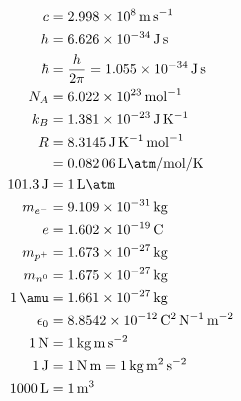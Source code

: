 \begin{align*}
c&= \SI{2.998e8}{\meter\per\second}\\
h&= \SI{6.626e-34}{\joule\second}\\
\hbar &= \frac{h}{2 \pi } = \SI{1.055e-34}{\joule\second}\\
N_A&= \SI{6.022e23}{\per\mole}\\
k_B&= \SI{1.381e-23}{\joule\per\kelvin}\\
R&= \SI{8.3145}{\joule\per\kelvin\per\mole}\\
&= \SI{0.08206}{\liter\atm\per\mole\per\kelvin}\\
\SI{101.3}{\joule}&=\SI{1}{\liter\atm}\\
m_{e^-}&=\SI{9.109e-31}{\kilo\gram}\\
e &= \SI{1.602e-19}{\coulomb}\\
m_{p^+}&=\SI{1.673e-27}{\kilo\gram}\\
m_{n^0} &= \SI{1.675e-27}{\kilo\gram}\\
\SI{1}{\amu} &= \SI{1.661e-27}{\kilo\gram}\\
\epsilon_0 &= \SI{8.8542e-12}{\coulomb\squared\per\newton\per\meter\squared}\\
\SI{1}{\newton} &= \SI{1}{\kilo\gram\meter\per\second\squared}\\
\SI{1}{\joule}&= \SI{1}{\newton\meter} = \SI{1}{\kilo\gram\meter\squared\per\second\squared}\\
\SI{1000}{\liter} &= \SI{1}{\meter\cubed}\\
\end{align*}
